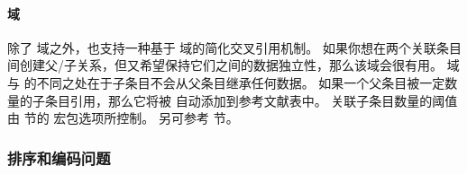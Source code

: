 \paragraph{ 域}%
\label{bib:cav:ref:ref}


除了  域之外，\biblatex 也支持一种基于  域的简化交叉引用机制。
如果你想在两个关联条目间创建父\slash 子关系，但又希望保持它们之间的数据独立性，那么该域会很有用。
 域与  的不同之处在于子条目不会从父条目继承任何数据。
如果一个父条目被一定数量的子条目引用，那么它将被 \biblatex 自动添加到参考文献表中。
关联子条目数量的阈值由  节的  宏包选项所控制。
另可参考  节。

\subsubsection{排序和编码问题}
\label{bib:cav:enc}


